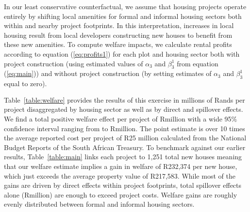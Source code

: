 \documentclass[12pt]{article}
\begin{document}
In our least conservative counterfactual, we assume that housing projects operate entirely by shifting local amenities for formal and informal housing sectors both within and nearby project footprints.  In this interpretation, increases in local housing result from local developers constructing new houses to benefit from these new amenities.  To compute welfare impacts, we calculate rental profits according to equation (\ref{eq:profits1}) for each plot and housing sector both with project construction (using estimated values of $\alpha_3$ and $\beta_3^{1}$ from equation (\ref{eq:main})) and without project construction (by setting estimates of $\alpha_3$ and $\beta_3^{1}$ equal to zero).  

Table~\ref{table:welfare} provides the results of this exercise in millions of Rands per project disaggregated by housing sector as well as by direct and spillover effects.  We find a total positive welfare effect per project of Rmillion with a wide 95\% confidence interval ranging from to Rmillion.  The point estimate is over 10 times the average reported cost per project of R25 million calculated from the National Budget Reports of the South African Treasury. To benchmark against our earlier results, Table~\ref{table:main} links each project to 1,251 total new houses meaning that our welfare estimate implies a gain in welfare of R232,374 per new house, which just exceeds the average property value of R217,583.  While most of the gains are driven by direct effects within project footprints, total spillover effects alone (Rmillion) are enough to exceed project costs.  Welfare gains are roughly evenly distributed between formal and informal housing sectors.  
\end{document}
